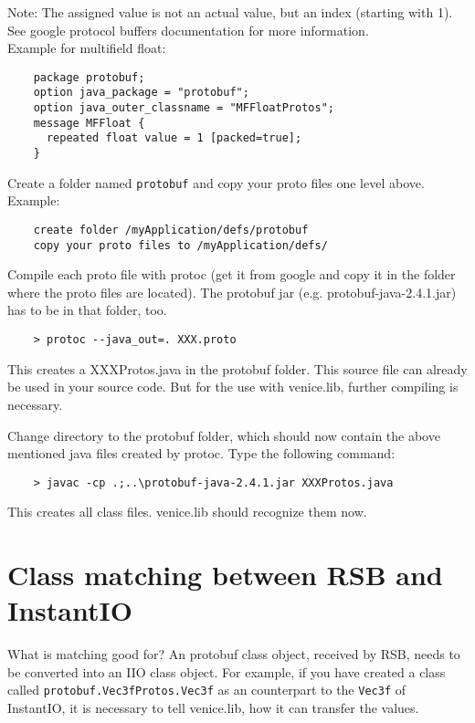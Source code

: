 \documentclass[german,a4paper]{article}
\begin{document}
Note: The assigned value is not an actual value, but an index (starting with 1).  See google protocol buffers documentation for more information.\\

Example for multifield float:
\begin{lstlisting}
    package protobuf;
    option java_package = "protobuf";
    option java_outer_classname = "MFFloatProtos";
    message MFFloat {
      repeated float value = 1 [packed=true];
    }
\end{lstlisting}

Create a folder named \texttt{protobuf} and copy your proto files one level above.\\

Example:
\begin{lstlisting}
    create folder /myApplication/defs/protobuf
    copy your proto files to /myApplication/defs/
\end{lstlisting}

Compile each proto file with protoc (get it from google and copy it in the folder where the proto files are located).  The protobuf jar (e.g. protobuf-java-2.4.1.jar) has to be in that folder, too.
\begin{lstlisting}
    > protoc --java_out=. XXX.proto
\end{lstlisting}
This creates a XXXProtos.java in the protobuf folder.  This source file can already be used in your source code.  But for the use with venice.lib, further compiling is necessary.

Change directory to the protobuf folder, which should now contain the above mentioned java files created by protoc.  Type the following command:
\begin{lstlisting}
    > javac -cp .;..\protobuf-java-2.4.1.jar XXXProtos.java
\end{lstlisting}
This creates all class files.  venice.lib should recognize them now.

\section{Class matching between RSB and InstantIO}
\label{sec:matching}

What is matching good for? An protobuf class object, received by RSB, needs to be converted into an IIO class object. For example, if you have created a class called \texttt{protobuf.Vec3fProtos.Vec3f} as an counterpart to the \texttt{Vec3f} of InstantIO, it is necessary to tell venice.lib, how it can transfer the values.
 
\end{document}
